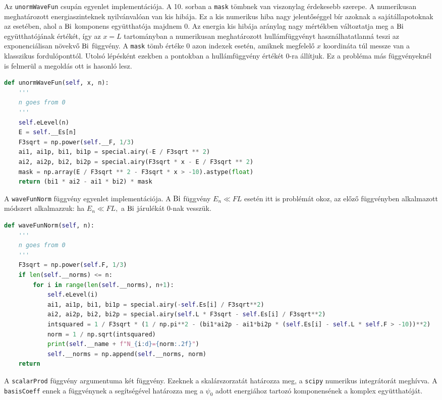 Az \texttt{unormWaveFun} csupán  egyenlet implementációja. A 10. sorban a \texttt{mask} tömbnek van viszonylag érdekesebb szerepe. A numerikusan meghatározott energiaszinteknek nyilvánvalóan van kis hibája. Ez a kis numerikus hiba nagy jelentőséggel bír azoknak a sajátállapotoknak az esetében, ahol a $\operatorname{Bi}$ komponens együtthatója majdnem $0$. Az energia kis hibája aránylag nagy mértékben változtatja meg a $\operatorname{Bi}$ együtthatójának értékét, így az $x=L$ tartományban a numerikusan meghatározott hullámfüggvényt használhatatlanná teszi az exponenciálisan növekvő $\operatorname{Bi}$ függvény. A \texttt{mask} tömb értéke $0$ azon indexek esetén, amiknek megfelelő $x$ koordináta túl messze van a klasszikus fordulóponttól. Utolsó lépésként ezekben a pontokban a hullámfüggvény értékét $0$-ra állítjuk. Ez a probléma más függvényeknél is felmerül a megoldás ott is hasonló lesz.
\begin{lstlisting}[language=Python]
def unormWaveFun(self, x, n):
    '''
    n goes from 0
    '''
    self.eLevel(n)
    E = self.__Es[n]
    F3sqrt = np.power(self.__F, 1/3)
    ai1, ai1p, bi1, bi1p = special.airy(-E / F3sqrt ** 2)
    ai2, ai2p, bi2, bi2p = special.airy(F3sqrt * x - E / F3sqrt ** 2)
    mask = np.array(E / F3sqrt ** 2 - F3sqrt * x > -10).astype(float)
    return (bi1 * ai2 - ai1 * bi2) * mask
\end{lstlisting}
A \texttt{waveFunNorm} függvény  egyenlet implementációja. A $\operatorname{Bi}$ függvény $E_n \ll FL$ esetén itt is problémát okoz, az előző függvényben alkalmazott módszert alkalmazzuk: ha $E_n \ll FL,$ a $\operatorname{Bi}$ járulékát $0$-nak vesszük.
\begin{lstlisting}[language=Python]
def waveFunNorm(self, n):
    '''
    n goes from 0
    '''
    F3sqrt = np.power(self.F, 1/3)
    if len(self.__norms) <= n:
        for i in range(len(self.__norms), n+1):
            self.eLevel(i)
            ai1, ai1p, bi1, bi1p = special.airy(-self.Es[i] / F3sqrt**2)
            ai2, ai2p, bi2, bi2p = special.airy(self.L * F3sqrt - self.Es[i] / F3sqrt**2)
            intsquared = 1 / F3sqrt * (1 / np.pi**2 - (bi1*ai2p - ai1*bi2p * (self.Es[i] - self.L * self.F > -10))**2)
            norm = 1 / np.sqrt(intsquared)
            print(self.__name + f"N_{i:d}={norm:.2f}")
            self.__norms = np.append(self.__norms, norm)
    return
\end{lstlisting}
A \texttt{scalarProd} függvény argumentuma két függvény. Ezeknek a skalárszorzatát határozza meg, a \texttt{scipy} numerikus integrátorát meghívva. A \texttt{basisCoeff} ennek a függvénynek a segítségével határozza meg a $\psi_0$ adott energiához tartozó komponensének a komplex együtthatóját.
